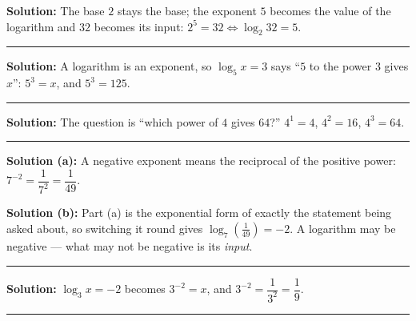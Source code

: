 \documentclass[12pt]{article}
\begin{document}



\textbf{Solution:} The base $2$ stays the base; the exponent $5$ becomes the
value of the logarithm and $32$ becomes its input:
$2^5 = 32 \iff \log_2 32 = 5$. 

\vspace{0.2cm}\noindent\rule{\linewidth}{0.2pt}\vspace{0.2cm}


\textbf{Solution:} A logarithm is an exponent, so $\log_5 x = 3$ says
``$5$ to the power $3$ gives $x$'': $5^3 = x$, and $5^3 = 125$.

\vspace{0.2cm}\noindent\rule{\linewidth}{0.2pt}\vspace{0.2cm}


\textbf{Solution:} The question is ``which power of $4$ gives $64$?''
$4^1 = 4$, $4^2 = 16$, $4^3 = 64$. 

\vspace{0.2cm}\noindent\rule{\linewidth}{0.2pt}\vspace{0.2cm}


\textbf{Solution (a):} A negative exponent means the reciprocal of the positive
power: $7^{-2} = \dfrac{1}{7^2} = \dfrac{1}{49}$. 

\textbf{Solution (b):} Part (a) is the exponential form of exactly the statement
being asked about, so switching it round gives
$\log_7\!\left(\tfrac{1}{49}\right) = -2$. A logarithm may be negative --- what
may not be negative is its \emph{input}. 

\vspace{0.2cm}\noindent\rule{\linewidth}{0.2pt}\vspace{0.2cm}


\textbf{Solution:} $\log_3 x = -2$ becomes $3^{-2} = x$, and
$3^{-2} = \dfrac{1}{3^2} = \dfrac{1}{9}$. 

\vspace{0.2cm}\noindent\rule{\linewidth}{0.2pt}\vspace{0.2cm}
\end{document}
